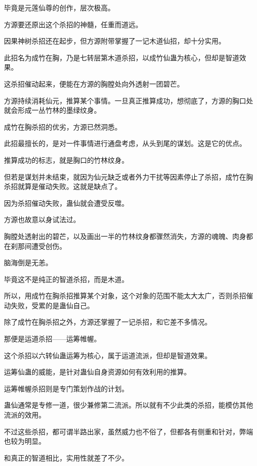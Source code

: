 \begin{this_body}
毕竟是元莲仙尊的创作，层次极高。

方源要还原出这个杀招的神髓，任重而道远。

因果神树杀招还在起步，但方源附带掌握了一记木道仙招，却十分实用。

此招名为成竹在胸，乃是七转层第木道杀招，以成竹仙蛊为核心，但却是智道效果。

这杀招催动起来，便能在方源的胸膛处向外透射一团碧芒。

方源持续消耗仙元，推算某个事情。一旦真正推算成功，想彻底了，方源的胸口处就会形成一丛竹林的墨绿纹身。

成竹在胸杀招的优劣，方源已然洞悉。

此招最擅长的，是对一件事情进行通盘考虑，从头到尾的谋划。这是它的优点。

推算成功的标志，就是胸口的竹林纹身。

但若是谋划并未结束，就因为仙元缺乏或者外力干扰等因素停止了杀招，成竹在胸杀招就算是催动失败。这就是缺点了。

因为杀招催动失败，蛊仙就会遭受反噬。

方源也故意以身试法过。

胸膛处透射出的碧芒，以及画出一半的竹林纹身都骤然消失，方源的魂魄、肉身都在刹那间遭受创伤。

脑海倒是无恙。

毕竟这不是纯正的智道杀招，而是木道。

所以，用成竹在胸杀招推算某个对象，这个对象的范围不能太大太广，否则杀招催动失败，受累的是蛊仙自己。

除了成竹在胸杀招之外，方源还掌握了一记杀招，和它差不多情况。

那便是运道杀招——运筹帷幄。

这个杀招以六转仙蛊运筹为核心，属于运道流派，但却是智道效果。

运筹仙蛊的威能，是针对蛊仙自身资源如何有效利用的推算。

运筹帷幄杀招则是专门策划作战的计划。

蛊仙通常是专修一道，很少兼修第二流派。所以就有不少此类的杀招，能模仿其他流派的效用。

不过这些杀招，都可谓半路出家，虽然威力也不俗了，但都各有侧重和针对，弊端也较为明显。

和真正的智道相比，实用性就差了不少。

\end{this_body}

